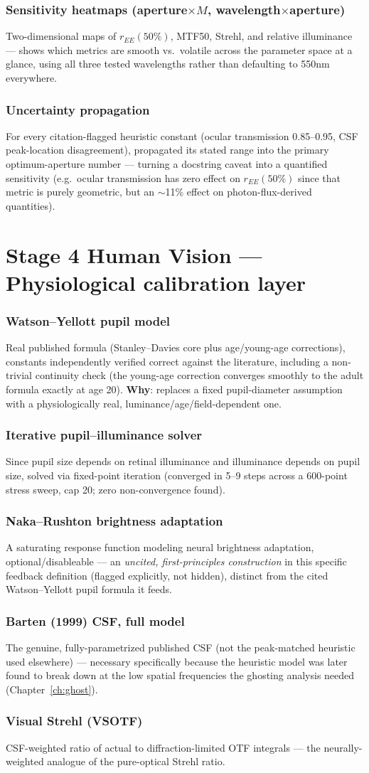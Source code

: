 \documentclass[10pt]{report}
\newcommand{\feat}[1]{\subsection*{#1}}
\begin{document}
\feat{Sensitivity heatmaps (aperture$\times M$, wavelength$\times$aperture)}
Two-dimensional maps of $r_{EE}(50\%)$, MTF50, Strehl, and relative illuminance --- shows which metrics are smooth vs.\ volatile across the parameter space at a glance, using all three tested wavelengths rather than defaulting to 550nm everywhere.

\feat{Uncertainty propagation}
For every citation-flagged heuristic constant (ocular transmission 0.85--0.95, CSF peak-location disagreement), propagated its stated range into the primary optimum-aperture number --- turning a docstring caveat into a quantified sensitivity (e.g.\ ocular transmission has zero effect on $r_{EE}(50\%)$ since that metric is purely geometric, but an $\sim$11\% effect on photon-flux-derived quantities).

\chapter{Stage 4 Human Vision --- Physiological calibration layer}
\feat{Watson--Yellott pupil model}
Real published formula (Stanley--Davies core plus age/young-age corrections), constants independently verified correct against the literature, including a non-trivial continuity check (the young-age correction converges smoothly to the adult formula exactly at age 20). \textbf{Why}: replaces a fixed pupil-diameter assumption with a physiologically real, luminance/age/field-dependent one.

\feat{Iterative pupil--illuminance solver}
Since pupil size depends on retinal illuminance and illuminance depends on pupil size, solved via fixed-point iteration (converged in 5--9 steps across a 600-point stress sweep, cap 20; zero non-convergence found).

\feat{Naka--Rushton brightness adaptation}
A saturating response function modeling neural brightness adaptation, optional/disableable --- an \emph{uncited, first-principles construction} in this specific feedback definition (flagged explicitly, not hidden), distinct from the cited Watson--Yellott pupil formula it feeds.

\feat{Barten (1999) CSF, full model}
The genuine, fully-parametrized published CSF (not the peak-matched heuristic used elsewhere) --- necessary specifically because the heuristic model was later found to break down at the low spatial frequencies the ghosting analysis needed (Chapter~\ref{ch:ghost}).

\feat{Visual Strehl (VSOTF)}
CSF-weighted ratio of actual to diffraction-limited OTF integrals --- the neurally-weighted analogue of the pure-optical Strehl ratio.
\end{document}
